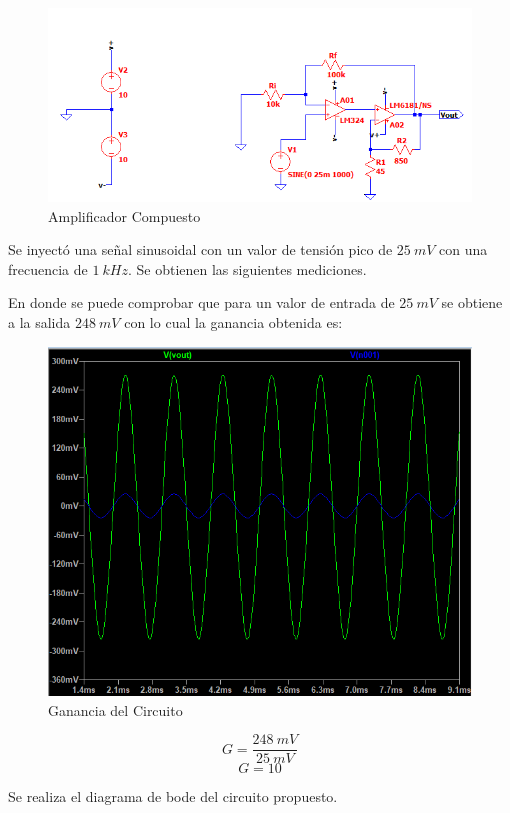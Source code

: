 \begin{figure}[H]
    \centering
    \includegraphics[width=0.7\linewidth]{VFA-CFA-Simulacion.png}
    \caption{Amplificador Compuesto}
    \label{fig:enter-label}
\end{figure}

\hspace{1mm} Se inyectó una señal sinusoidal con un valor de tensión pico de \(25~mV\) con una frecuencia de \( 1~kHz \).  Se obtienen las siguientes mediciones.


\hspace{1mm} En donde se puede comprobar que para un valor de entrada de \( 25~mV \) se obtiene a la salida \( 248~mV \) con lo cual la ganancia obtenida es:

\begin{figure}[H]
    \centering
    \includegraphics[width=0.7
    \linewidth]{VFA-CFA-Ganancia.png}
    \caption{Ganancia del Circuito }
    \label{fig:enter-label}
\end{figure}

\begin{equation}
    G = \frac{248~mV}{25~mV}
\end{equation}
\begin{equation}
    \boxed{
    G = 10
    }
\end{equation}

\hspace{1mm} Se realiza el diagrama de bode del circuito propuesto. 

